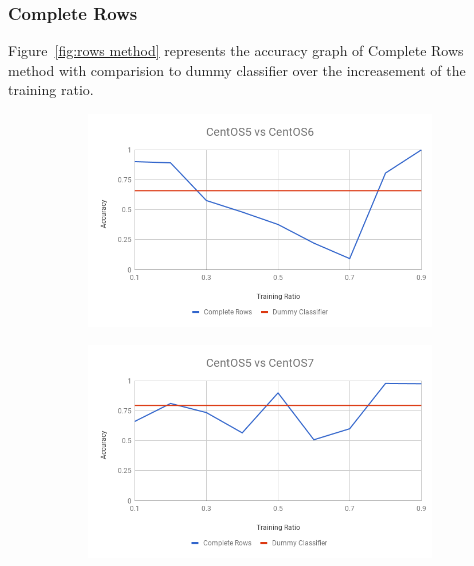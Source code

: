 \documentclass[10pt, conference, compsocconf]{IEEEtran}
\begin{document}
\subsubsection{Complete Rows}
Figure~\ref{fig:rows method} represents
the accuracy graph of Complete Rows method with comparision to dummy
classifier over the increasement of the training ratio.
\begin{figure}[h!]
        \centering
        \begin{subfigure}[b]{0.8\linewidth}
                \includegraphics[width=\columnwidth]{figures/ALS/rows-ALS-5vs6-PFS}
        \end{subfigure}
        \begin{subfigure}[b]{0.8\linewidth}
                \includegraphics[width=\columnwidth]{figures/ALS/rows-ALS-5vs7-PFS}
        \end{subfigure}
        \begin{subfigure}[b]{0.8\linewidth}

\end{subfigure}
\end{figure}
\end{document}
